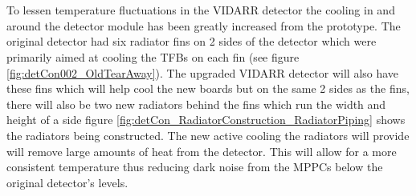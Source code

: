 \\\\To lessen temperature fluctuations in the VIDARR detector the cooling in and around the detector module has been greatly increased from the prototype. The original detector had six radiator fins on 2 sides of the detector which were primarily aimed at cooling the TFBs on each fin (see figure \ref{fig:detCon002_OldTearAway}). The upgraded VIDARR detector will also have these fins which will help cool the new boards but on the same 2 sides as the fins, there will also be two new radiators behind the fins which run the width and height of a side figure \ref{fig:detCon_RadiatorConstruction_RadiatorPiping} shows the radiators being constructed. The new active cooling the radiators will provide will remove large amounts of heat from the detector. This will allow for a more consistent temperature  thus reducing dark noise from the MPPCs below the original detector's levels. 

